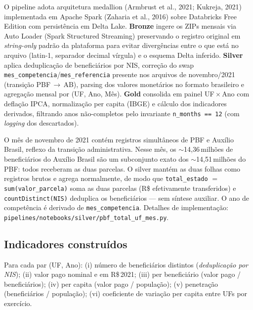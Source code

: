 \documentclass[12pt,a4paper,oneside]{article}
\newcommand{\rs}{R\$\,}
\begin{document}
O pipeline adota arquitetura medallion (Armbrust et al., 2021; Kukreja, 2021) implementada em Apache
Spark (Zaharia et al., 2016) sobre Databricks Free Edition com
persistência em Delta Lake.
\textbf{Bronze} ingere os ZIPs mensais via Auto Loader (Spark
Structured Streaming) preservando o registro original em
\textit{string-only} \textemdash{} padrão da plataforma para evitar
divergências entre o que está no arquivo (latin-1, separador
decimal vírgula) e o esquema Delta inferido.
\textbf{Silver} aplica deduplicação de beneficiários por NIS,
correção do swap \texttt{mes\_competencia}/\texttt{mes\_referencia}
presente nos arquivos de novembro/2021 (transição PBF\,$\to$\,AB),
parsing dos valores monetários no formato brasileiro e agregação
mensal por (UF, Ano, Mês).
\textbf{Gold} consolida em painel UF\,$\times$\,Ano com deflação
IPCA, normalização per capita (IBGE) e cálculo dos indicadores
derivados, filtrando anos não-completos pelo invariante
\texttt{n\_months == 12} (com \textit{logging} dos descartados).

\begin{tcolorbox}[
  colback=blue!2,colframe=blue!60!black,
  boxrule=0.6pt,arc=2pt,
  left=8pt,right=8pt,top=4pt,bottom=4pt,
  title={\small\textbf{Nota metodológica — tratamento da transição PBF\,$\to$\,AB em novembro de 2021}},
  fonttitle=\small\bfseries,
  ]\small
O mês de novembro de 2021 contém registros simultâneos de PBF e
Auxílio Brasil, reflexo da transição administrativa. Nesse mês,
os $\sim$14,36\,milhões de beneficiários do Auxílio Brasil são um
subconjunto exato dos $\sim$14,51\,milhões do PBF: todos receberam as
duas parcelas. O silver mantém as duas folhas como registros brutos e
agrega normalmente, de modo que \texttt{total\_estado} $=$
\texttt{sum(valor\_parcela)} soma as duas parcelas (R\$ efetivamente
transferidos) e \texttt{countDistinct(NIS)} deduplica os beneficiários
— sem síntese auxiliar. O ano de competência é derivado de
\texttt{mes\_competencia}. Detalhes de implementação:
\texttt{pipelines/notebooks/silver/pbf\_total\_uf\_mes.py}.
\end{tcolorbox}

\subsection{Indicadores construídos}

Para cada par (UF, Ano): (i) número de beneficiários distintos
(\textit{deduplicação por NIS});
(ii) valor pago nominal e em \rs 2021;
(iii) per beneficiário (valor pago / beneficiários);
(iv) per capita (valor pago / população);
(v) penetração (beneficiários / população);
(vi) coeficiente de variação per capita entre UFs por exercício.
\end{document}
